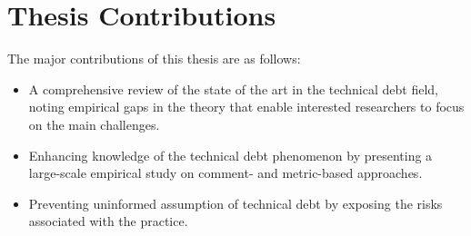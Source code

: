 \section{Thesis Contributions}
The major contributions of this thesis are as follows:
\begin{itemize}
	\item A comprehensive review of the state of the art in the technical debt field, noting empirical gaps in the theory that enable interested researchers to focus on the main challenges.
	\item Enhancing knowledge of the technical debt phenomenon by presenting a large-scale empirical study on comment- and metric-based approaches.
	\item Preventing uninformed assumption of technical debt by exposing the risks associated with the practice.

\end{itemize}